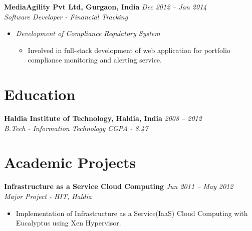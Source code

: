 \documentclass[margin,line]{resume}
\begin{document}
\begin{resume}
    \textbf{MediaAgility Pvt Ltd, Gurgaon, India}   \hfill \textsl{Dec 2012 -- Jan 2014} \vspace{0mm}\\\vspace{0mm}%
           \textsl{Software Developer - Financial Tracking}\\
    \begin{itemize}
    
     \item \textsl{Development of Compliance Regulatory System} 
        \begin{itemize}
            \item Involved in full-stack development of web application for portfolio compliance monitoring and alerting service.
        \end{itemize}
    
    \end{itemize}
        
    \section{\mysidestyle Education}

    \textbf{Haldia Institute of Technology, Haldia, India} \hfill \textsl{2008 -- 2012}\vspace{0mm}\\\vspace{0mm}%
    \textsl{B.Tech - Information Technology} \textsl{CGPA - 8.47} \hfill



    \section{\mysidestyle Academic Projects}
    \textbf{Infrastructure as a Service Cloud Computing} \hfill \textsl{Jun 2011 -- May 2012}\vspace{0mm}\\\vspace{0mm}%
    \textsl{Major Project - HIT, Haldia} 
       \begin{itemize} 
	        \item Implementation of Infrastructure as a Service(IaaS) Cloud Computing with Eucalyptus using Xen Hypervisor.
       \end{itemize}


\end{resume}
\end{document}
